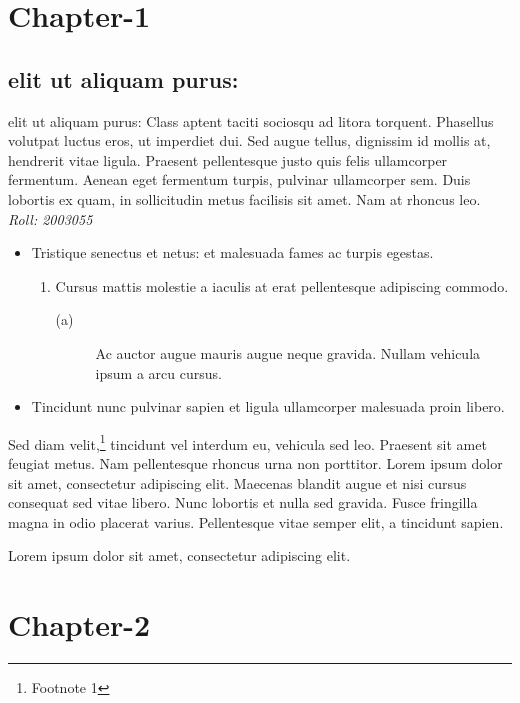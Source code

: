 \documentclass{book}
\begin{document}
\chapter[]{Chapter-1}
\section[1]{elit ut aliquam purus:}
\begin{minipage}
    elit ut aliquam purus: Class aptent taciti sociosqu ad litora torquent.
Phasellus volutpat luctus eros, ut imperdiet dui. 
Sed augue tellus, dignissim id mollis at, hendrerit vitae ligula. 
Praesent pellentesque justo quis felis ullamcorper fermentum. 
Aenean eget fermentum turpis, pulvinar ullamcorper sem. 
Duis lobortis ex quam, in sollicitudin metus facilisis sit amet. Nam at rhoncus leo.
\newline
\emph{Roll: 2003055}
\begin{itemize}
    \item Tristique senectus et netus: et malesuada fames ac turpis egestas.
    \begin{enumerate}
        \item  Cursus mattis molestie a iaculis at erat pellentesque adipiscing commodo.
        \begin{description}
            \item[(a)]Ac auctor augue mauris augue neque gravida. Nullam vehicula ipsum a arcu cursus.
        \end{description}
    \end{enumerate}
    
    \item Tincidunt nunc pulvinar sapien et ligula ullamcorper malesuada proin libero.
\end{itemize}
 

Sed diam velit,\footnote[1]{Footnote 1} tincidunt vel interdum eu, vehicula sed leo. 
Praesent sit amet feugiat metus. Nam pellentesque rhoncus urna non porttitor. 
Lorem ipsum dolor sit amet, consectetur adipiscing elit. 
Maecenas blandit augue et nisi cursus consequat sed vitae libero. 
Nunc lobortis et nulla sed gravida. Fusce fringilla magna in odio placerat varius. 
Pellentesque vitae semper elit, a tincidunt sapien. 
\begin{flushright}
    Lorem ipsum dolor sit amet, consectetur adipiscing elit.
\end{flushright}
\end{minipage}

\chapter[]{Chapter-2}
\end{document}
